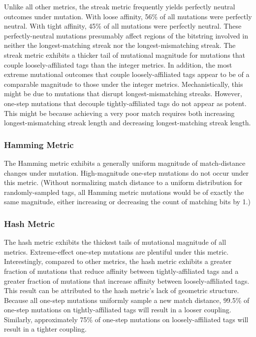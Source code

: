Unlike all other metrics, the streak metric frequently yields perfectly neutral outcomes under mutation.
With loose affinity, 56\% of all mutations were perfectly neutral.
With tight affinity, 45\% of all mutations were perfectly neutral.
These perfectly-neutral mutations presumably affect regions of the bitstring involved in neither the longest-matching streak nor the longest-mismatching streak.
The streak metric exhibits a thicker tail of mutational magnitude for mutations that couple loosely-affiliated tags than the integer metrics.
In addition, the most extreme mutational outcomes that couple loosely-affiliated tags appear to be of a comparable magnitude to those under the integer metrics.
Mechanistically, this might be due to mutations that disrupt longest-mismatching streaks.
However, one-step mutations that decouple tightly-affiliated tags do not appear as potent.
This might be because achieving a very poor match requires both increasing longest-mismatching streak length and decreasing longest-matching streak length.

\subsubsection{Hamming Metric}

The Hamming metric exhibits a generally uniform magnitude of match-distance changes under mutation.
High-magnitude one-step mutations do not occur under this metric.
(Without normalizing match distance to a uniform distribution for randomly-sampled tags, all Hamming metric mutations would be of exactly the same magnitude, either increasing or decreasing the count of matching bits by 1.)

\subsubsection{Hash Metric}

The hash metric exhibits the thickest tails of mutational magnitude of all metrics.
Extreme-effect one-step mutations are plentiful under this metric.
Interestingly, compared to other metrics, the hash metric exhibits a greater fraction of mutations that reduce affinity between tightly-affiliated tags and a greater fraction of mutations that increase affinity between loosely-affiliated tags.
This result can be attributed to the hash metric's lack of geometric structure.
Because all one-step mutations uniformly sample a new match distance, 99.5\% of one-step mutations on tightly-affiliated tags will result in a looser coupling.
Similarly, approximately 75\% of one-step mutations on loosely-affiliated tags will result in a tighter coupling.


